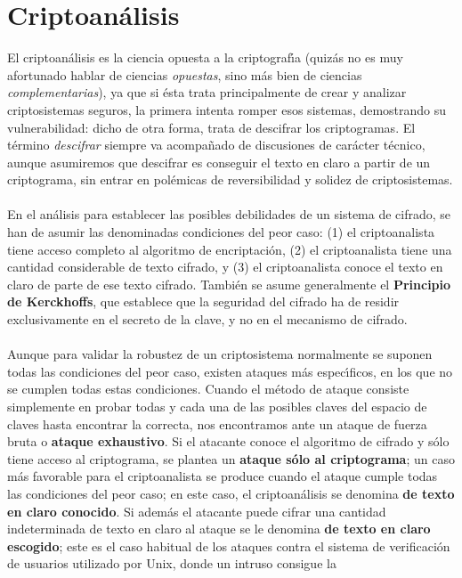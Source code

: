 \section{Criptoan\'alisis}
El criptoan\'alisis es la ciencia opuesta a la criptograf\'{\i}a (quiz\'as
no es muy afortunado hablar de ciencias {\it opuestas}, sino m\'as bien de 
ciencias {\it complementarias}), ya 
que si \'esta trata principalmente de crear y analizar criptosistemas seguros,
la primera intenta romper esos sistemas, demostrando su vulnerabilidad: dicho
de otra forma, trata de descifrar los criptogramas.
El t\'ermino {\it descifrar} siempre va acompa\~nado de discusiones de 
car\'acter t\'ecnico, aunque asumiremos que descifrar es conseguir el texto en 
claro a partir de un criptograma, sin entrar en pol\'emicas de reversibilidad y 
solidez de criptosistemas.\\
\\En el an\'alisis para establecer las posibles debilidades de un
sistema de cifrado, se han de asumir las denominadas condiciones del peor
caso: 
(1) el criptoanalista tiene acceso completo al algoritmo de encriptaci\'on,
(2) el criptoanalista tiene una cantidad considerable de texto cifrado,
y (3) el criptoanalista conoce el texto en claro de parte de ese texto
cifrado. Tambi\'en se asume generalmente el {\bf Principio de Kerckhoffs},
que establece que la seguridad del cifrado ha de residir exclusivamente
en el secreto de la clave, y no en el mecanismo de cifrado.\\
\\Aunque para validar la robustez de un criptosistema normalmente se
suponen todas las condiciones del peor caso, existen ataques m\'as
espec\'{\i}ficos, en los que no se cumplen todas estas condiciones. Cuando el
m\'etodo de ataque consiste simplemente en probar todas y cada una de las
posibles claves del espacio de claves hasta encontrar la correcta, nos 
encontramos ante un ataque de fuerza bruta o {\bf ataque exhaustivo}. Si
el atacante conoce el algoritmo de cifrado y s\'olo tiene acceso al
criptograma, se plantea un {\bf ataque s\'olo al criptograma}; un caso m\'as 
favorable
para el criptoanalista se produce cuando el ataque cumple todas las condiciones
del peor caso; en este caso, el criptoan\'alisis se denomina
{\bf de texto en claro conocido}. Si adem\'as el atacante puede cifrar una 
cantidad 
indeterminada de texto en claro al ataque se le denomina {\bf de texto en claro 
escogido}; este es el caso habitual de los ataques contra el sistema de
verificaci\'on de usuarios utilizado por Unix, donde un intruso consigue la
